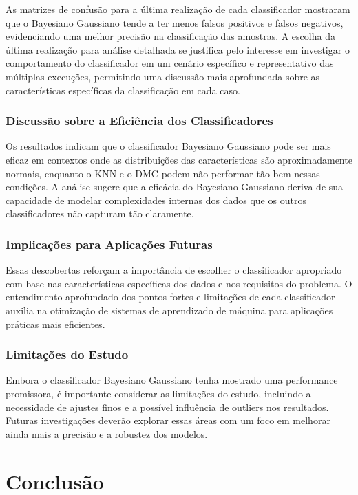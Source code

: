 \documentclass[12pt, a4paper]{report}
\begin{document}
As matrizes de confusão para a última realização de cada classificador mostraram que o Bayesiano Gaussiano tende a ter menos falsos positivos e falsos negativos, evidenciando uma melhor precisão na classificação das amostras. A escolha da última realização para análise detalhada se justifica pelo interesse em investigar o comportamento do classificador em um cenário específico e representativo das múltiplas execuções, permitindo uma discussão mais aprofundada sobre as características específicas da classificação em cada caso.

\subsection{Discussão sobre a Eficiência dos Classificadores}
Os resultados indicam que o classificador Bayesiano Gaussiano pode ser mais eficaz em contextos onde as distribuições das características são aproximadamente normais, enquanto o KNN e o DMC podem não performar tão bem nessas condições. A análise sugere que a eficácia do Bayesiano Gaussiano deriva de sua capacidade de modelar complexidades internas dos dados que os outros classificadores não capturam tão claramente.


\subsection{Implicações para Aplicações Futuras}
Essas descobertas reforçam a importância de escolher o classificador apropriado com base nas características específicas dos dados e nos requisitos do problema. O entendimento aprofundado dos pontos fortes e limitações de cada classificador auxilia na otimização de sistemas de aprendizado de máquina para aplicações práticas mais eficientes.


\subsection{Limitações do Estudo}
Embora o classificador Bayesiano Gaussiano tenha mostrado uma performance promissora, é importante considerar as limitações do estudo, incluindo a necessidade de ajustes finos e a possível influência de outliers nos resultados. Futuras investigações deverão explorar essas áreas com um foco em melhorar ainda mais a precisão e a robustez dos modelos.


\chapter{Conclusão}
\end{document}
